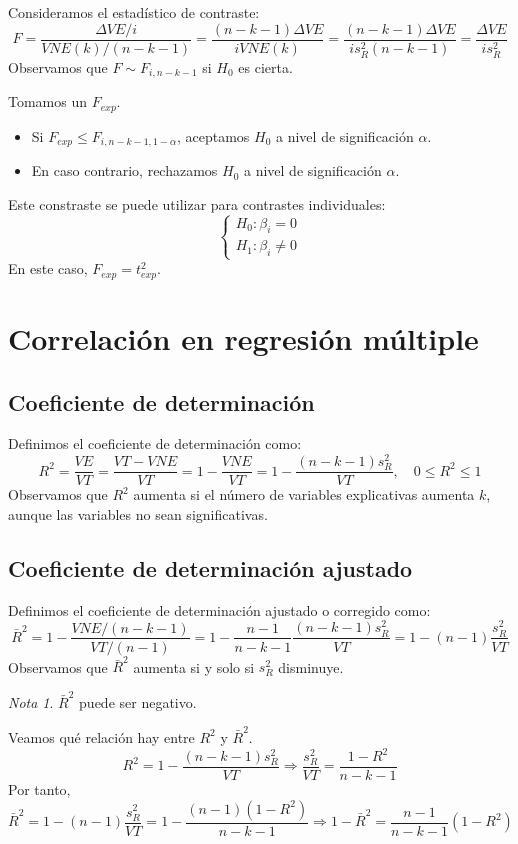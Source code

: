 \documentclass{report}
\theoremstyle{remark}
\theoremstyle{remark}
\newtheorem*{note}{Nota}
\theoremstyle{remark}
\theoremstyle{definition}
\theoremstyle{definition}
\theoremstyle{definition}
\begin{document}
Consideramos el estadístico de contraste:
$$F = \frac{\Delta VE / i}{VNE(k) / (n-k-1)} = \frac{(n-k-1)\Delta VE}{iVNE(k)} = \frac{(n-k-1)\Delta VE}{is_R^2(n-k-1)} = \frac{\Delta VE}{is_R^2}$$
Observamos que $F \sim F_{i, n-k-1}$ si $H_0$ es cierta.

Tomamos un $F_{exp}$.
\begin{itemize}
    \item Si $F_{exp} \leq F_{i, n-k-1, 1-\alpha}$, aceptamos $H_0$ a nivel de significación $\alpha$.
    \item En caso contrario, rechazamos $H_0$ a nivel de significación $\alpha$.
\end{itemize}

Este constraste se puede utilizar para contrastes individuales:
$$\begin{cases}
        H_0: \beta_i = 0 \\
        H_1: \beta_i \neq 0
    \end{cases}$$
En este caso, $F_{exp} = t_{exp}^2$.

\section{Correlación en regresión múltiple}
\subsection*{Coeficiente de determinación}
Definimos el coeficiente de determinación como:
$$R^2 = \frac{VE}{VT} = \frac{VT - VNE}{VT} = 1 - \frac{VNE}{VT} = 1 - \frac{(n-k-1)s_R^2}{VT}, \quad 0 \leq R^2 \leq 1$$
Observamos que $R^2$ aumenta si el número de variables explicativas aumenta $k$, aunque las variables no sean significativas.

\subsection*{Coeficiente de determinación ajustado}
Definimos el coeficiente de determinación ajustado o corregido como:
$$\bar{R}^2 = 1 - \frac{VNE/(n-k-1)}{VT/(n-1)} = 1 - \frac{n-1}{n-k-1}\frac{(n-k-1)s_R^2}{VT} = 1 - (n-1)\frac{s_R^2}{VT}$$
Observamos que $\bar{R}^2$ aumenta si y solo si $s_R^2$ disminuye.

\begin{note}
    $\bar{R}^2$ puede ser negativo.
\end{note}

Veamos qué relación hay entre $R^2$ y $\bar{R}^2$.
$$R^2 = 1 - \frac{(n-k-1)s_R^2}{VT} \Rightarrow \frac{s_R^2}{VT} = \frac{1-R^2}{n-k-1}$$
Por tanto,
$$\bar{R}^2 = 1 - (n-1)\frac{s_R^2}{VT} = 1 - \frac{(n-1)(1-R^2)}{n-k-1} \Rightarrow 1 - \bar{R}^2 = \frac{n-1}{n-k-1}(1 - R^2)$$
\end{document}
